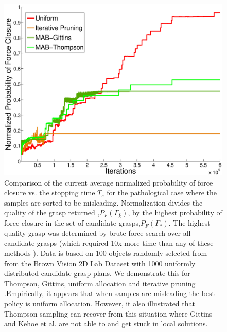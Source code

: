 \documentclass[10pt, conference]{ieeeconf}      %
\begin{document}
\begin{figure}[t!]
\centering
\includegraphics[scale=0.25]{matlab_figures/worst_case.eps}
\caption{ \footnotesize 
Comparison of the current average normalized probability of force closure vs. the stopping time $T_s$ for the pathological case where the samples are sorted to be misleading.   Normalization divides the quality of the  grasp returned ,$P_F(\Gamma_{\bar{k}})$, by the highest probability of force closure in the set of  candidate grasps,$P_F(\Gamma_*)$. The highest quality grasp was determined by brute force search over all candidate grasps (which required 10x  more time than any of these methods \cite{kehoe2012toward}).  Data is based on 100 objects randomly selected from from the Brown Vision 2D Lab Dataset \cite{brown} with 1000 uniformly distributed candidate grasp plans. We demonstrate this for Thompson, Gittins, uniform allocation and iterative pruning \cite{kehoe2012estimating}.Empirically, it appears that when samples are misleading the best policy is uniform allocation. However, it also illustrated that Thompson sampling can recover from this situation where Gittins and Kehoe et al.  are not able to and get stuck in local solutions. }
\vspace*{-10pt}
\label{fig:worst_case}
\end{figure}
\end{document}
